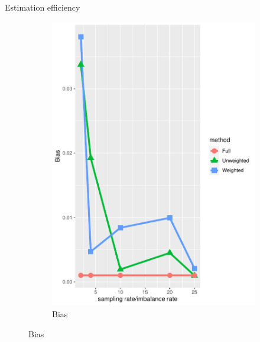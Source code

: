 \documentclass{beamer}
\begin{document}
\begin{frame}{Estimation efficiency}
\begin{figure}
\begin{subfigure}{0.47\textwidth}
		\includegraphics[width=\textwidth]{bias2.pdf}
		\caption{Bias}
	\end{subfigure}
	\label{fig:imb}
	\end{figure}
    \end{frame}
\end{document}
